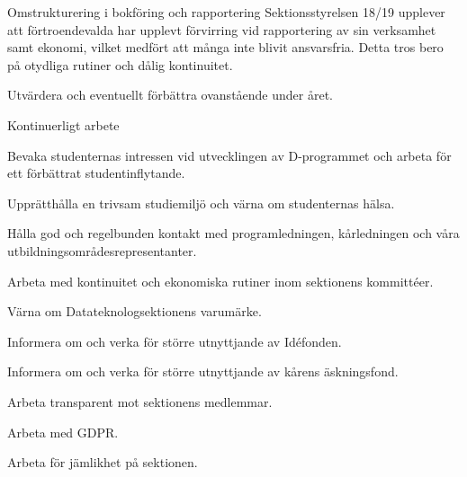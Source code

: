 \documentclass{dTeX-base}
\begin{document}
  \begin{FokusPunkt}{Omstrukturering i bokföring och rapportering}{
    Sektionsstyrelsen 18/19 upplever att förtroendevalda har upplevt förvirring
    vid rapportering av sin verksamhet samt ekonomi, vilket medfört att många
    inte blivit ansvarsfria. Detta tros bero på otydliga rutiner och dålig
    kontinuitet.
  }
    \item Utvärdera och eventuellt förbättra ovanstående under året.
  \end{FokusPunkt}

  \begin{FokusPunkt}{Kontinuerligt arbete}
    \item Bevaka studenternas intressen vid utvecklingen av D-programmet och
      arbeta för ett förbättrat studentinflytande.
    \item Upprätthålla en trivsam studiemiljö och värna om studenternas hälsa.
    \item Hålla god och regelbunden kontakt med programledningen, kårledningen
      och våra utbildningsområdesrepresentanter.
    \item Arbeta med kontinuitet och ekonomiska rutiner inom sektionens
      kommittéer.
    \item Värna om Datateknologsektionens varumärke.
    \item Informera om och verka för större utnyttjande av Idéfonden.
    \item Informera om och verka för större utnyttjande av kårens äskningsfond.
    \item Arbeta transparent mot sektionens medlemmar.
    \item Arbeta med GDPR.
    \item Arbeta för jämlikhet på sektionen.
  \end{FokusPunkt}
\end{document}
